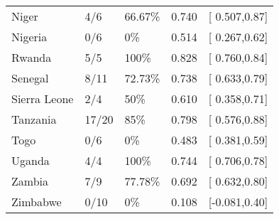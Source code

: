 \begin{table}[ht]
\begin{tabular}{lllrl}
  Niger & 4/6 & 66.67\% & 0.740 & [ 0.507,0.87] \\ 
  Nigeria & 0/6 & 0\% & 0.514 & [ 0.267,0.62] \\ 
  Rwanda & 5/5 & 100\% & 0.828 & [ 0.760,0.84] \\ 
  Senegal & 8/11 & 72.73\% & 0.738 & [ 0.633,0.79] \\ 
  Sierra Leone & 2/4 & 50\% & 0.610 & [ 0.358,0.71] \\ 
  Tanzania & 17/20 & 85\% & 0.798 & [ 0.576,0.88] \\ 
  Togo & 0/6 & 0\% & 0.483 & [ 0.381,0.59] \\ 
  Uganda & 4/4 & 100\% & 0.744 & [ 0.706,0.78] \\ 
  Zambia & 7/9 & 77.78\% & 0.692 & [ 0.632,0.80] \\ 
  Zimbabwe & 0/10 & 0\% & 0.108 & [-0.081,0.40] \\ 
   \hline
\end{tabular}
\end{table}
